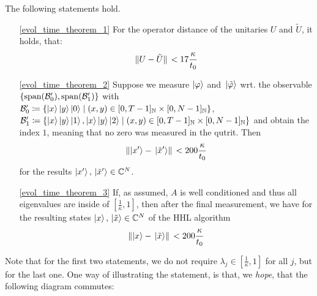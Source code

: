 \begin{theorem} \label{evol_time_theorem}
    The following statements hold.
    \begin{enumerate}[label=(\roman*), wide]
        \item[\ref{evol_time_theorem_1}] For the operator distance of the unitaries \(U\) and \(\tilde{U}\), it holds, that:
        \begin{align}
            \norm*{U-\tilde{U}} < 17\frac{\kappa}{t_0}
        \end{align}
        \item[\ref{evol_time_theorem_2}] Suppose we measure \(\ket{\varphi}\) and \(\ket*{\tilde{\varphi}}\) wrt. the observable \(\{\operatorname{span}(\mathcal{B}'_0), \operatorname{span}(\mathcal{B}'_1)\}\) with \(\mathcal{B}'_0 \coloneqq \{\ket{x}\ket{y}\ket{0} \mid (x, y) \in [0, T-1]_{\mathbb{N}} \times [0, N-1]_{\mathbb{N}}\}\), \(\mathcal{B}'_1 \coloneqq \{\ket{x}\ket{y}\ket{1}, \ket{x}\ket{y}\ket{2} \mid (x, y) \in [0, T-1]_{\mathbb{N}} \times [0, N-1]_{\mathbb{N}}\}\) and obtain the index \(1\), meaning that no zero was measured in the qutrit. Then
        \begin{align}
            \norm*{\ket{x'}-\ket*{\tilde{x}'}} < 200\frac{\kappa}{t_0}
        \end{align}
        for the results \(\ket{x'}, \ket*{\tilde{x}'} \in \mathbb{C}^N\).
        \item[\ref{evol_time_theorem_3}] If, as assumed, \(A\) is well conditioned and thus all eigenvalues are inside of \(\left[\frac{1}{\kappa}, 1\right]\), then after the final measurement, we have for the resulting states \(\ket{x}, \ket*{\tilde{x}} \in \mathbb{C}^N\) of the HHL algorithm
        \begin{align}
            \norm*{\ket{x}-\ket*{\tilde{x}}} < 200\frac{\kappa}{t_0}
        \end{align}
    \end{enumerate}
\end{theorem}

Note that for the first two statements, we do not require \(\lambda_j \in \left[\frac{1}{\kappa}, 1\right]\) for all \(j\), but for the last one. One way of illustrating the statement, is that, we \emph{hope}, that the following diagram commutes:

